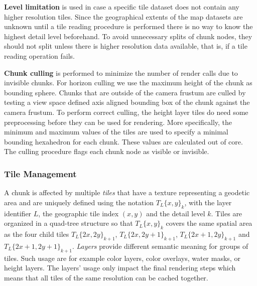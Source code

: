 \documentclass[journal]{vgtc}                %
\begin{document}
\noindent\textbf{Level limitation} is used in case a specific tile dataset does not contain any higher resolution tiles.
Since the geographical extents of the map datasets are unknown until a tile reading procedure is performed there is no way to know the highest detail level beforehand.
To avoid unnecessary splits of chunk nodes, they should not split unless there is higher resolution data available, that is, if a tile reading operation fails.

\noindent\textbf{Chunk culling} is performed to minimize the number of render calls due to invisible chunks.
For horizon culling we use the maximum height of the chunk as bounding sphere.
Chunks that are outside of the camera frustum are culled by testing a view space defined axis aligned bounding box of the chunk against the camera frustum.
To perform correct culling, the height layer tiles do need some preprocessing before they can be used for rendering. More specifically, the minimum and maximum values of the tiles are used to specify a minimal bounding hexahedron for each chunk. These values are calculated out of core.
The culling procedure flags each chunk node as visible or invisible.

\subsubsection{Tile Management} \label{sec:tilemgmt}
A chunk is affected by multiple \emph{tiles} that have a texture representing a geodetic area and are uniquely defined using the notation $T_L\{x,y\}_k$, with the layer identifier $L$, the geographic tile index $\left( x,y \right)$ and the detail level $k$.
Tiles are organized in a quad-tree structure so that $T_L\{x,y\}_k$ covers the same spatial area as the four child tiles $T_L\{2x,2y\}_{k+1}$, $T_L\{2x,2y+1\}_{k+1}$, $T_L\{2x+1,2y\}_{k+1}$ and $T_L\{2x+1,2y+1\}_{k+1}$.
\emph{Layers} provide different semantic meaning for groups of tiles. Such usage are for example color layers, color overlays, water masks, or height layers.
The layers' usage only impact the final rendering steps which means that all tiles of the same resolution can be cached together.
\end{document}
